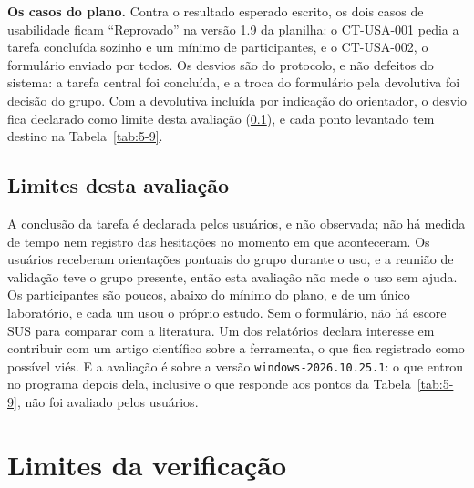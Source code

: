 \textbf{Os casos do plano.} Contra o resultado esperado escrito, os dois casos de usabilidade ficam ``Reprovado'' na versão 1.9 da planilha: o CT-USA-001 pedia a tarefa concluída sozinho e um mínimo de participantes, e o CT-USA-002, o formulário enviado por todos. Os desvios são do protocolo, e não defeitos do sistema: a tarefa central foi concluída, e a troca do formulário pela devolutiva foi decisão do grupo. Com a devolutiva incluída por indicação do orientador, o desvio fica declarado como limite desta avaliação (\ref{sec:5-4-5}), e cada ponto levantado tem destino na Tabela~\ref{tab:5-9}.

\subsection{Limites desta avaliação}\label{sec:5-4-5}

A conclusão da tarefa é declarada pelos usuários, e não observada; não há medida de tempo nem registro das hesitações no momento em que aconteceram. Os usuários receberam orientações pontuais do grupo durante o uso, e a reunião de validação teve o grupo presente, então esta avaliação não mede o uso sem ajuda. Os participantes são poucos, abaixo do mínimo do plano, e de um único laboratório, e cada um usou o próprio estudo. Sem o formulário, não há escore SUS para comparar com a literatura. Um dos relatórios declara interesse em contribuir com um artigo científico sobre a ferramenta, o que fica registrado como possível viés. E a avaliação é sobre a versão \texttt{windows-\allowbreak{}2026.\allowbreak{}10.\allowbreak{}25.\allowbreak{}1}: o que entrou no programa depois dela, inclusive o que responde aos pontos da Tabela~\ref{tab:5-9}, não foi avaliado pelos usuários.

\section{Limites da verificação}\label{sec:5-5}


